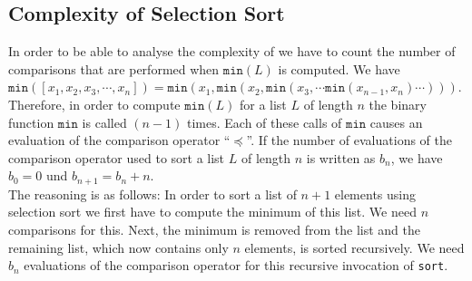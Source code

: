 \subsection{Complexity of Selection Sort}
In order to be able to analyse the complexity of  we have to count the number
of comparisons that are performed when $\mathtt{min}(L)$ is computed.  We have 
\\[0.2cm]
\hspace*{1.3cm} 
$\mathtt{min}([x_1,x_2,x_3,\cdots,x_n]) = \mathtt{min}(x_1, \mathtt{min}(x_2, \mathtt{min}(x_3, \cdots \mathtt{min}(x_{n-1},x_n) \cdots )))$. 
\\[0.2cm]
Therefore, in order to compute $\mathtt{min}(L)$ for a list $L$ of length $n$ the binary function $\mathtt{min}$
is called $(n-1)$ times.  Each of these calls of $\mathtt{min}$ causes an evaluation of the comparison
operator ``$\preceq$''.  If the number of evaluations of the comparison operator used to sort a list
$L$ of length $n$ is written as $b_n$, we have \\[0.2cm]
\hspace*{1.3cm}
$b_0 = 0$ \quad und \quad $b_{n+1} = b_n + n$. 
\\[0.2cm]
The reasoning is as follows: In order to sort a list of $n+1$ elements using selection sort we first
have to compute the minimum of this list.  We need $n$ comparisons for this.  Next, the minimum is
removed from the list and the remaining list, which now contains only $n$ elements, is sorted
recursively.  We need $b_n$ evaluations of the comparison operator for this recursive invocation of
\texttt{sort}.

